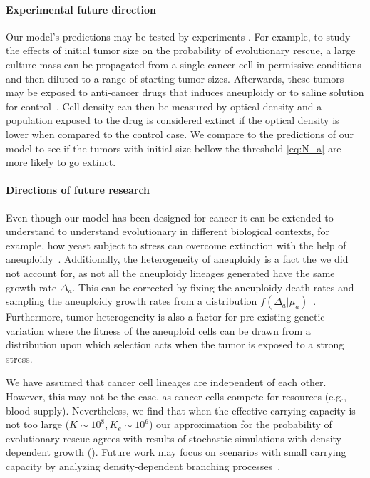 \documentclass[12pt]{extarticle}
\begin{document}
\paragraph{Experimental future direction}
Our model's predictions may be tested by experiments \citep{martin2013probability}. For example, to study the effects of initial tumor size on the probability of evolutionary rescue, a large culture mass can be propagated from a single cancer cell in permissive conditions and then diluted to a  range of starting tumor sizes. Afterwards, these tumors may be exposed to anti-cancer drugs that induces aneuploidy %
or to saline solution for control~\citep{ippolito2021gene}. 
Cell density can then be measured by optical density and a population exposed to the drug is considered extinct if the optical density is lower when compared to the control case. We compare to the predictions of our model to see if the tumors with initial size bellow the threshold \eqref{eq:N_a} are more likely to go extinct. %


\paragraph{Directions of future research}
Even though our model has been designed for cancer it can be extended to understand to understand evolutionary in different biological contexts, for example, how yeast subject to stress can overcome extinction with the help of aneuploidy~\citep{pompei2023fitness}. Additionally, the heterogeneity of aneuploidy is a fact the we did not account for, as not all the aneuploidy lineages generated have the same growth rate $\Delta_a$. This can be corrected by  fixing the aneuploidy death rates and sampling the aneuploidy growth rates from a distribution $f\left(\Delta_a|\mu_a\right)$~\citet{martin2013probability}. Furthermore, tumor heterogeneity is also a factor for pre-existing genetic variation where the fitness of the aneuploid cells can be drawn from a distribution upon which selection acts when the tumor is exposed to a strong stress.

We have assumed that cancer cell lineages are independent of each other. However, this may not be the case, as cancer cells compete for resources (e.g., blood supply). Nevertheless, we find that when the effective carrying capacity is not too large ($K\sim10^8, K_e\sim10^6$) %
our approximation for the probability of evolutionary rescue agrees with results of stochastic simulations with density-dependent growth  ().
Future work may focus on scenarios with small carrying capacity by analyzing density-dependent branching processes~\citep{klebaner1997population,harris1963theory}. %
\end{document}
